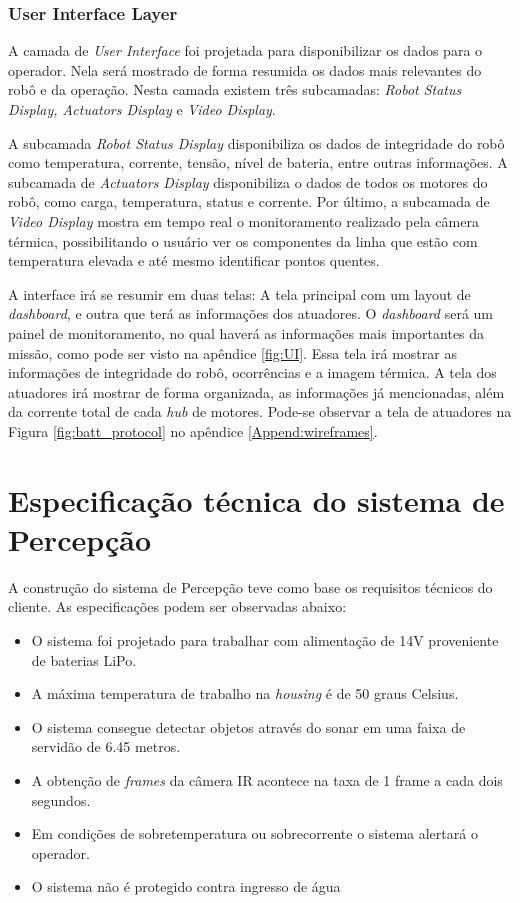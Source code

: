 \subsubsection{User Interface Layer}

A camada de \textit{User Interface} foi projetada para disponibilizar os dados para o operador. Nela será mostrado de forma resumida os dados mais relevantes do robô e da operação. Nesta camada existem três subcamadas: \textit{Robot Status Display, Actuators Display} e \textit{Video Display}. 

A subcamada \textit{Robot Status Display} disponibiliza os dados de integridade do robô como temperatura, corrente, tensão, nível de bateria, entre outras informações. A subcamada de \textit{Actuators Display} disponibiliza o dados de todos os motores do robô, como carga, temperatura, status e corrente. Por último, a subcamada de \textit{Video Display} mostra em tempo real o monitoramento realizado pela câmera térmica, possibilitando o usuário ver os componentes da linha que estão com temperatura elevada e até mesmo identificar pontos quentes.

A interface irá se resumir em duas telas: A tela principal com um layout de \textit{dashboard}, e outra que terá as informações dos atuadores. O \textit{dashboard} será um painel de monitoramento, no qual haverá as informações mais importantes da missão, como pode ser visto na apêndice \ref{fig:UI}. Essa tela irá mostrar as informações de integridade do robô, ocorrências e a imagem térmica. A tela dos atuadores irá mostrar de forma organizada, as informações já mencionadas, além da corrente total de cada \textit{hub} de motores. Pode-se observar a tela de atuadores na Figura \ref{fig:batt_protocol} no apêndice \ref{Append:wireframes}.


\section{Especificação técnica do sistema de Percepção}
\label{ssec:espt}

A construção do sistema de Percepção teve como base os requisitos técnicos do cliente. As especificações podem ser observadas abaixo:
\begin{itemize}
\item O sistema foi projetado para trabalhar com alimentação de 14V proveniente de baterias LiPo.
\item A máxima temperatura de trabalho na \textit{housing} é de 50 graus Celsius.
\item O sistema consegue detectar objetos através do sonar em uma faixa de servidão de 6.45 metros.
\item A obtenção de \textit{frames} da câmera IR acontece na taxa de 1 frame a cada dois segundos.
\item Em condições de sobretemperatura ou sobrecorrente o sistema alertará o operador.
\item O sistema não é protegido contra ingresso de água
\end{itemize} 


